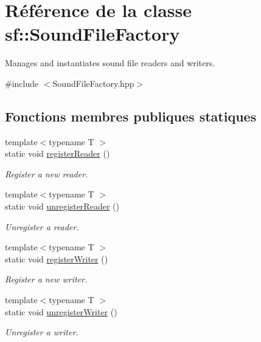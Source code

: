 \hypertarget{classsf_1_1SoundFileFactory}{}\section{Référence de la classe sf\+:\+:Sound\+File\+Factory}
\label{classsf_1_1SoundFileFactory}


Manages and instantiates sound file readers and writers.  




{\ttfamily \#include $<$Sound\+File\+Factory.\+hpp$>$}

\subsection*{Fonctions membres publiques statiques}
\begin{DoxyCompactItemize}
\item 
{\footnotesize template$<$typename T $>$ }\\static void \hyperlink{classsf_1_1SoundFileFactory_acaf1f0bf1b7c7b9988ec76b33e33fe95}{register\+Reader} ()
\begin{DoxyCompactList}\small\item\em Register a new reader. \end{DoxyCompactList}\item 
{\footnotesize template$<$typename T $>$ }\\static void \hyperlink{classsf_1_1SoundFileFactory_a9e6765c41e2784bc755388afb4a2f432}{unregister\+Reader} ()
\begin{DoxyCompactList}\small\item\em Unregister a reader. \end{DoxyCompactList}\item 
{\footnotesize template$<$typename T $>$ }\\static void \hyperlink{classsf_1_1SoundFileFactory_a3a59140e6ccf1f252f721b790eddd661}{register\+Writer} ()
\begin{DoxyCompactList}\small\item\em Register a new writer. \end{DoxyCompactList}\item 
{\footnotesize template$<$typename T $>$ }\\static void \hyperlink{classsf_1_1SoundFileFactory_a2306f90d1f72e474732e4bcceeb34215}{unregister\+Writer} ()
\begin{DoxyCompactList}\small\item\em Unregister a writer. \end{DoxyCompactList}\item 

\end{DoxyCompactItemize}
